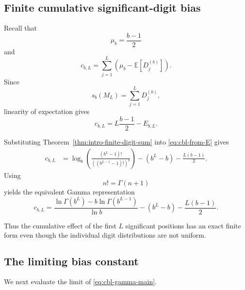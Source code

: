 \documentclass[11pt]{article}
\theoremstyle{definition}
\theoremstyle{remark}
\begin{document}
\subsection{Finite cumulative significant-digit bias}
\label{subsec:finite-cumulative-bias}

Recall that
\[
    \mu_b=\frac{b-1}{2}
\]
and
\[
    c_{b,L}
    =
    \sum_{j=1}^{L}
    \left(
        \mu_b-\mathbb E[D_j^{(b)}]
    \right).
\]
Since
\[
    s_b(M_L)
    =
    \sum_{j=1}^{L}D_j^{(b)},
\]
linearity of expectation gives
\begin{equation}
    c_{b,L}
    =
    L\frac{b-1}{2}
    -
    E_{b,L}.
    \label{eq:cbl-from-E}
\end{equation}

Substituting
Theorem~\ref{thm:intro-finite-digit-sum} into
\eqref{eq:cbl-from-E} gives
\begin{align}
    c_{b,L}
    &=
    \log_b
    \left(
        \frac{
            (b^L-1)!
        }{
            ((b^{L-1}-1)!)^b
        }
    \right)
    -
    (b^L-b)
    -
    \frac{L(b-1)}{2}.
    \label{eq:cbl-factorial}
\end{align}
Using
\[
    n!=\Gamma(n+1)
\]
yields the equivalent Gamma representation
\begin{equation}
\boxed{
    c_{b,L}
    =
    \frac{
        \ln\Gamma(b^L)
        -
        b\ln\Gamma(b^{L-1})
    }{\ln b}
    -
    (b^L-b)
    -
    \frac{L(b-1)}{2}.
}
\label{eq:cbl-gamma-main}
\end{equation}

Thus the cumulative effect of the first \(L\) significant positions
has an exact finite form even though the individual digit
distributions are not uniform.


\subsection{The limiting bias constant}
\label{subsec:limiting-bias}

We next evaluate the limit of
\eqref{eq:cbl-gamma-main}.
\end{document}
